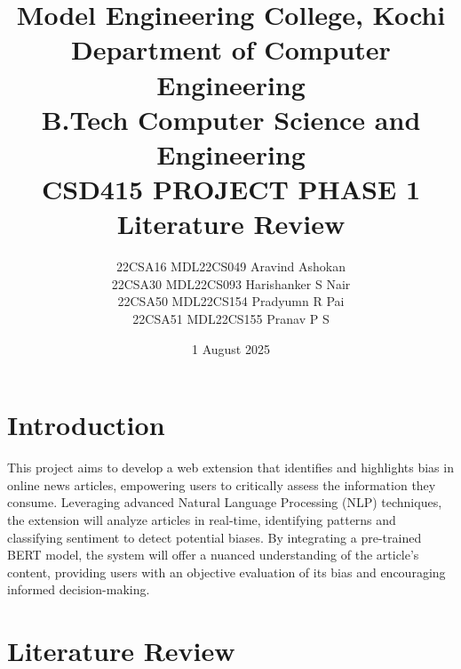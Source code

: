 \documentclass{article}
\begin{document}
\sloppy

\title{Model Engineering College, Kochi\\
    Department of Computer Engineering\\
    B.Tech Computer Science and Engineering\\
    CSD415 PROJECT PHASE 1\\
    \textbf{Literature Review}\\
}

\author{
    22CSA16 MDL22CS049 Aravind Ashokan\\
    22CSA30 MDL22CS093 Harishanker S Nair\\
    22CSA50 MDL22CS154 Pradyumn R Pai\\
    22CSA51 MDL22CS155 Pranav P S\\
}
\date{1 August 2025}
\maketitle

\section{Introduction}
This project aims to develop a web extension that identifies and highlights bias in online news articles, empowering users to critically assess the information they consume. Leveraging advanced Natural Language Processing (NLP) techniques, the extension will analyze articles in real-time, identifying patterns and classifying sentiment to detect potential biases. By integrating a pre-trained BERT model, the system will offer a nuanced understanding of the article's content, providing users with an objective evaluation of its bias and encouraging informed decision-making.

\section{Literature Review}








\end{document}
